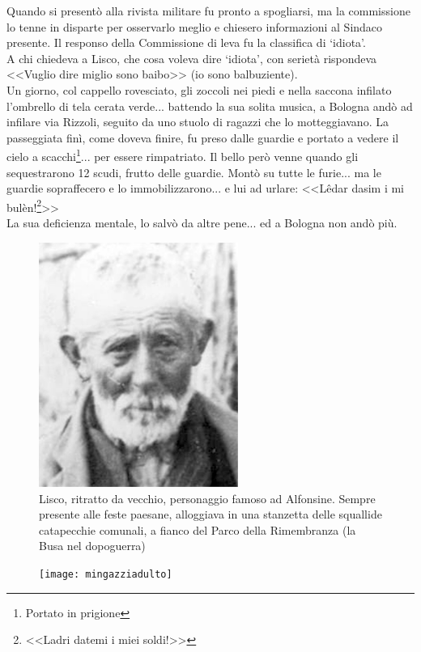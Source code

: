 \indent Quando si presentò alla rivista militare fu pronto a spogliarsi, ma la commissione lo tenne in disparte per osservarlo meglio e chiesero informazioni al Sindaco presente. Il responso della Commissione di leva fu la classifica di `idiota'.\\
\indent A chi chiedeva a Lisco, che cosa voleva dire `idiota', con serietà rispondeva <<Vuglio dire miglio sono baibo>> (io sono balbuziente).\\
\indent Un giorno, col cappello rovesciato, gli zoccoli nei piedi e nella saccona infilato l'ombrello di tela cerata verde... battendo la sua solita musica, a Bologna andò ad infilare via Rizzoli, seguito da uno stuolo di ragazzi che lo motteggiavano. La passeggiata finì, come doveva finire, fu preso dalle guardie e portato a vedere il cielo a scacchi\footnote{Portato in prigione}... per essere rimpatriato. Il bello però venne quando gli sequestrarono 12 scudi, frutto delle guardie. Montò su tutte le furie... ma le guardie sopraffecero e lo immobilizzarono... e lui ad urlare: <<Lêdar dasim i mi bulèn!\footnote{<<Ladri datemi i miei soldi!>>}>>\\
\indent La sua deficienza mentale, lo salvò da altre pene... ed a Bologna non andò più.\\

 \begin{figure}[htb]
    \centering
    \includegraphics[height=8cm]{Lisco}
    \caption[Lisco]{Lisco, ritratto da vecchio, personaggio famoso ad Alfonsine. Sempre presente alle feste paesane, alloggiava in una stanzetta delle squallide catapecchie comunali, a fianco del Parco della Rimembranza (la Busa nel dopoguerra)\label{fig:Lisco}}
\end{figure}

\newpage

 \begin{figure}[htb]
    \centering
    \texttt{[image: mingazziadulto]}
    \caption[Stefano Mingazzi]{\label{fig:mingazziadulto}}
\end{figure}


